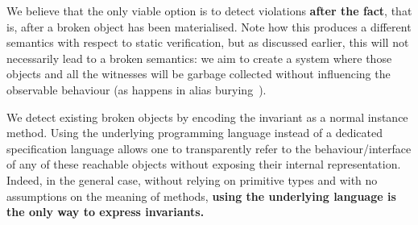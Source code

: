 We believe that the only viable option is to detect violations 
\textbf{after the fact}, that is,
after a broken object has been materialised.
Note how this produces a different semantics with respect to static verification, but as discussed earlier, this will not necessarily lead to a broken semantics: we aim to create a system where those objects and all the witnesses will be garbage collected without influencing the observable behaviour (as happens in alias burying~\cite{boyland2001alias}).

We detect existing broken objects by encoding the invariant as a normal instance method.
Using the underlying programming language instead of a dedicated specification language allows one to transparently refer to the behaviour/interface of any of these reachable objects without exposing their internal representation.
Indeed, in the general case, without relying on primitive types and with no assumptions on the meaning of methods,
\textbf{using the underlying language is the only way to express invariants.}


